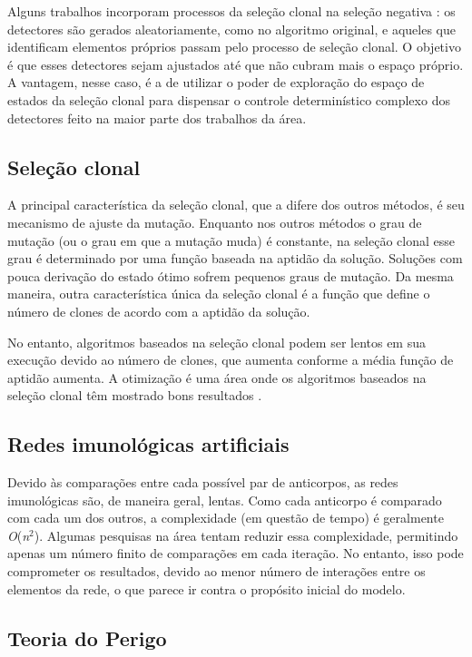 Alguns trabalhos incorporam processos da seleção clonal na seleção negativa \cite{Garrett2005}: os detectores são gerados aleatoriamente, como no algoritmo original, e aqueles que identificam elementos próprios passam pelo processo de seleção clonal. O objetivo é que esses detectores sejam ajustados até que não cubram mais o espaço próprio. A vantagem, nesse caso, é a de utilizar o poder de exploração do espaço de estados da seleção clonal para dispensar o controle determinístico complexo dos detectores feito na maior parte dos trabalhos da área.

\subsection{Seleção clonal}

A principal característica da seleção clonal, que a difere dos outros métodos, é seu mecanismo de ajuste da mutação. Enquanto nos outros métodos o grau de mutação (ou o grau em que a mutação muda) é constante, na seleção clonal esse grau é determinado por uma função baseada na aptidão da solução. Soluções com pouca derivação do estado ótimo sofrem pequenos graus de mutação. Da mesma maneira, outra característica única da seleção clonal é a função que define o número de clones de acordo com a aptidão da solução.

No entanto, algoritmos baseados na seleção clonal podem ser lentos em sua execução devido ao número de clones, que aumenta conforme a média função de aptidão aumenta. A otimização é uma área onde os algoritmos baseados na seleção clonal têm mostrado bons resultados \cite{Garrett2005}.

\subsection{Redes imunológicas artificiais}

Devido às comparações entre cada possível par de anticorpos, as redes imunológicas são, de maneira geral, lentas. Como cada anticorpo é comparado com cada um dos outros, a complexidade (em questão de tempo) é geralmente \emph{O}(\emph{n$^{2}$}). Algumas pesquisas na área tentam reduzir essa complexidade, permitindo apenas um número finito de comparações em cada iteração. No entanto, isso pode comprometer os resultados, devido ao menor número de interações entre os elementos da rede, o que parece ir contra o propósito inicial do modelo.

\subsection{Teoria do Perigo}

